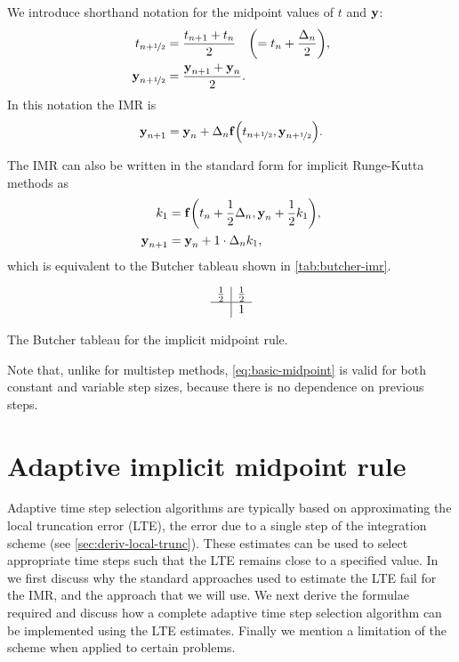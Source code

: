 We introduce shorthand notation for the midpoint values of $t$ and $\boldsymbol{\mathrm{y}}$:
\begin{equation}
  \begin{aligned}
    t_{n+\nicefrac{1}{2}} & = \frac{t_{n+1} + t_n}{2} \quad {\left( = t_n + \frac{\Delta_{n}}{2} \right)}, \\
    \boldsymbol{\mathrm{y}}_{n+\nicefrac{1}{2}} &= \frac{\boldsymbol{\mathrm{y}}_{n+1} + \boldsymbol{\mathrm{y}}_n}{2}.
  \end{aligned}
\end{equation}
In this notation the IMR is
\begin{equation}
  \boldsymbol{\mathrm{y}}_{n+1} = \boldsymbol{\mathrm{y}}_n + \Delta_{n} {\boldsymbol{\mathrm{f}}{\left( t_{n+\nicefrac{1}{2}}, \boldsymbol{\mathrm{y}}_{n+\nicefrac{1}{2}} \right)}}.
  \label{eq:basic-midpoint}
\end{equation}

The IMR can also be written in the standard form for implicit Runge-Kutta methods as
\begin{equation}
  \begin{aligned}
    k_1 &= {\boldsymbol{\mathrm{f}}{\left( t_n + \frac{1}{2} \Delta_{n}, \boldsymbol{\mathrm{y}}_n + \frac{1}{2} k_1 \right)}}, \\
    \boldsymbol{\mathrm{y}}_{n+1} &= \boldsymbol{\mathrm{y}}_n + 1 \cdot \Delta_{n} k_1,
  \end{aligned}
\end{equation}
which is equivalent to the Butcher tableau \cite[135]{HairerNorsettWanner} shown in \cref{tab:butcher-imr}.

\begin{table}
  \begin{equation*}
    \begin{array}{c|c}
      \frac{1}{2}  &     \frac{1}{2}  \\
      \hline
                   & 1 \\
    \end{array}
  \end{equation*}
  \caption{The Butcher tableau for the implicit midpoint rule.}
  \label{tab:butcher-imr}
\end{table}

Note that, unlike for multistep methods, \cref{eq:basic-midpoint} is valid for both constant and variable step sizes, because there is no dependence on previous steps.


\section{Adaptive implicit midpoint rule}
\label{sec:adapt-impl-midp}

Adaptive time step selection algorithms are typically based on approximating the local truncation error (LTE), the error due to a single step of the integration scheme (see \cref{sec:deriv-local-trunc}).
These estimates can be used to select appropriate time steps such that the LTE remains close to a specified value.
In  we first discuss why the standard approaches used to estimate the LTE fail for the IMR, and the approach that we will use.
We next derive the formulae required and discuss how a complete adaptive time step selection algorithm can be implemented using the LTE estimates.
Finally we mention a limitation of the scheme when applied to certain problems.


